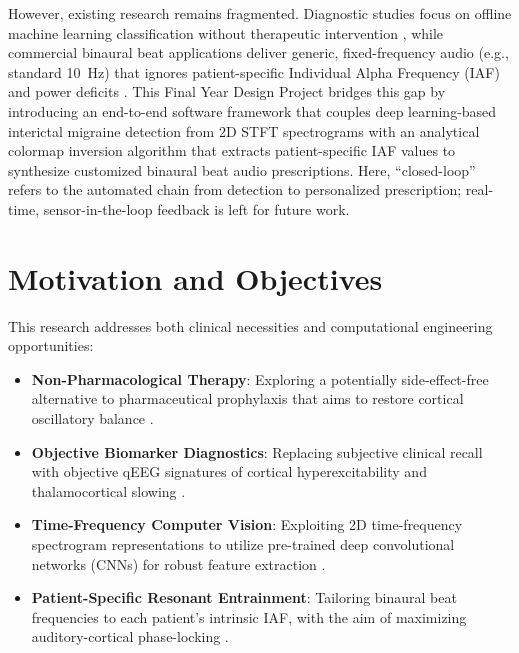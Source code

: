 \documentclass[12pt, a4paper]{report}
\begin{document}
However, existing research remains fragmented. Diagnostic studies focus on offline machine learning classification without therapeutic intervention \cite{aslan2023migrainecnn,orhanbulucu2023hybrid}, while commercial binaural beat applications deliver generic, fixed-frequency audio (e.g., standard 10~Hz) that ignores patient-specific Individual Alpha Frequency (IAF) and power deficits \cite{CoronaGonzalez2021,KahathuduwaBlume2025}. This Final Year Design Project bridges this gap by introducing an end-to-end software framework that couples deep learning-based interictal migraine detection from 2D STFT spectrograms with an analytical colormap inversion algorithm that extracts patient-specific IAF values to synthesize customized binaural beat audio prescriptions. Here, ``closed-loop'' refers to the automated chain from detection to personalized prescription; real-time, sensor-in-the-loop feedback is left for future work.

\section{Motivation and Objectives}
\label{sec:motivation_objectives}
This research addresses both clinical necessities and computational engineering opportunities:
\begin{itemize}
    \item \textbf{Non-Pharmacological Therapy}: Exploring a potentially side-effect-free alternative to pharmaceutical prophylaxis that aims to restore cortical oscillatory balance \cite{Quartetti2025,Shamsi2024}.
    \item \textbf{Objective Biomarker Diagnostics}: Replacing subjective clinical recall with objective qEEG signatures of cortical hyperexcitability and thalamocortical slowing \cite{chamanzar2021uhd,Petrusic2025}.
    \item \textbf{Time-Frequency Computer Vision}: Exploiting 2D time-frequency spectrogram representations to utilize pre-trained deep convolutional networks (CNNs) for robust feature extraction \cite{orhanbulucu2023hybrid,Rakhmatulin2024}.
    \item \textbf{Patient-Specific Resonant Entrainment}: Tailoring binaural beat frequencies to each patient's intrinsic IAF, with the aim of maximizing auditory-cortical phase-locking \cite{Melnichuk2025,Hamid2025,alonso2024individualized}.
\end{itemize}
\end{document}
